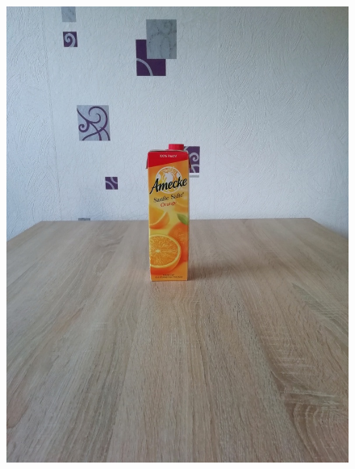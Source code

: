 \documentclass[a4paper,12pt,oneside]{article}
\begin{document}
\begin{figure}[htb]
\begin{minipage}[c]{0.2\textwidth}
\includegraphics[width=\textwidth]{Sources/Bild1_GW.jpg}
\end{minipage}
\hfill
\begin{minipage}[c]{0.08\textwidth}

\end{minipage}
\end{figure}
\end{document}
